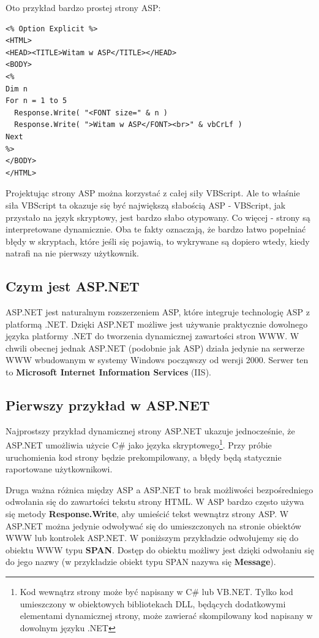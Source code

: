 Oto przykład bardzo prostej strony ASP:

\begin{scriptsize}
\begin{verbatim}
<% Option Explicit %>
<HTML>
<HEAD><TITLE>Witam w ASP</TITLE></HEAD>
<BODY>
<%
Dim n
For n = 1 to 5
  Response.Write( "<FONT size=" & n )
  Response.Write( ">Witam w ASP</FONT><br>" & vbCrLf )
Next
%>
</BODY>
</HTML>
\end{verbatim}
\end{scriptsize}

Projektując strony ASP można korzystać z całej siły VBScript. Ale to właśnie siła VBScript ta okazuje 
się być największą słabością ASP - VBScript, jak przystało na język skryptowy, 
jest bardzo słabo otypowany. Co więcej 
- strony są interpretowane dynamicznie. Oba te fakty oznaczają, że bardzo łatwo popełniać błędy
w skryptach, które jeśli się pojawią, to wykrywane są dopiero wtedy, kiedy natrafi na nie pierwszy
użytkownik.

\subsection{Czym jest ASP.NET}

ASP.NET jest naturalnym rozszerzeniem ASP, które integruje technologię ASP z platformą .NET.
Dzięki ASP.NET możliwe jest używanie praktycznie dowolnego języka platformy .NET do tworzenia
dynamicznej zawartości stron WWW. W chwili obecnej jednak ASP.NET (podobnie jak ASP) działa
jedynie na serwerze WWW wbudowanym w systemy Windows począwszy od wersji 2000. Serwer ten
to {\bf Microsoft Internet Information Services} (IIS).

\subsection{Pierwszy przykład w ASP.NET}

Najprostszy przykład dynamicznej strony ASP.NET ukazuje jednocześnie, że ASP.NET umożliwia
użycie C\# jako języka skryptowego\footnote{Kod wewnątrz strony może być napisany w C\# lub VB.NET. 
Tylko kod umieszczony w obiektowych bibliotekach DLL, będących dodatkowymi elementami dynamicznej strony, 
może zawierać skompilowany kod napisany w dowolnym języku .NET}. Przy próbie uruchomienia kod strony będzie
prekompilowany, a błędy będą statycznie raportowane użytkownikowi. 

Druga ważna różnica między ASP a ASP.NET to brak możliwości bezpośredniego odwołania się
do zawartości tekstu strony HTML. W ASP bardzo często używa się metody {\bf Response.Write}, aby
umieścić tekst wewnątrz strony ASP. W ASP.NET można jedynie odwoływać się do umieszczonych na stronie
obiektów WWW lub kontrolek ASP.NET. W poniższym przykładzie odwołujemy się do obiektu WWW typu
{\bf SPAN}. Dostęp do obiektu możliwy jest dzięki odwołaniu się do jego nazwy (w przykładzie
obiekt typu SPAN nazywa się {\bf Message}).

